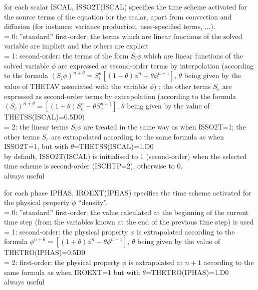 {for each scalar ISCAL, ISSO2T(ISCAL) specifies the time scheme activated
for the source terms of the equation for the scalar, apart from convection and
diffusion (for instance: variance production, user-specified terms, ...).\\
\hspace*{1.3cm}= 0: ''standard'' first-order: the terms which are linear
functions of the solved variable are implicit and the others are explicit\\
\hspace*{1.3cm}= 1: second-order: the terms of the form $S_i\phi$ which are
linear functions of the solved variable 
$\phi$ are expressed as second-order terms by interpolation (according
to the formula
$(S_i\phi)^{n+\theta}=S_i^n[(1-\theta)\phi^n+\theta\phi^{n+1}]$, $\theta$
being given by the value of THETAV associated with the variable $\phi$)
; the other terms $S_e$ are expressed as second-order terms by
extrapolation (according to the formula
$(S_e)^{n+\theta}=[(1+\theta)S_e^n-\theta S_e^{n-1}]$, $\theta$ being
given by the value of THETSS(ISCAL)=0.5D0)\\ 
\hspace*{1.3cm}= 2: the linear terms $S_i\phi$ are treated in the same
way as when ISSO2T=1;
the other terms $S_e$ are extrapolated according to the same formula
as when ISSO2T=1, but with $\theta$=THETSS(ISCAL)=1.D0\\
by default, ISSO2T(ISCAL) is initialised to 1 (second-order) when the selected
time scheme is second-order (ISCHTP=2), otherwise to 0.\\
always useful}


{for each phase IPHAS, IROEXT(IPHAS) specifies the time scheme activated
for the physical property $\phi$ ``density''.\\
\hspace*{1.3cm}= 0: ''standard'' first-order: the value calculated at
the beginning of the current time step (from the
variables known at the end of the previous time step) is used \\
\hspace*{1.3cm}= 1: second-order: the physical property $\phi$ is
extrapolated according to the formula
$\phi^{n+\theta}=[(1+\theta)\phi^n-\theta \phi^{n-1}]$, $\theta$ being
given by the value of THETRO(IPHAS)=0.5D0 \\
\hspace*{1.3cm}= 2: first-order: the physical property $\phi$ is
extrapolated at $n+1$ according to the
same formula as when IROEXT=1 but with $\theta$=THETRO(IPHAS)=1.D0\\
always useful}

